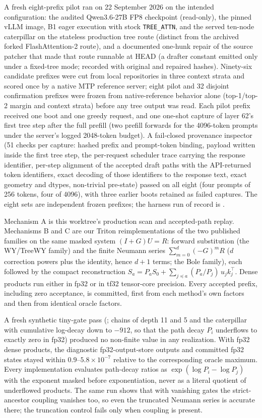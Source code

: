 \documentclass[conference]{IEEEtran}
\begin{document}
A fresh eight-prefix pilot ran on 22 September 2026 on the intended configuration: the audited Qwen3.6-27B FP8 checkpoint (read-only), the pinned vLLM image, B1 eager execution with stock \texttt{TREE\_ATTN}, and the served ten-node caterpillar on the stateless production tree route (distinct from the archived forked FlashAttention-2 route), and a documented one-hunk repair of the source patcher that made that route runnable at HEAD (a drafter constant emitted only under a fixed-tree mode; recorded with original and repaired hashes). Ninety-six candidate prefixes were cut from local repositories in three context strata and scored once by a native MTP reference server; eight pilot and 32 disjoint confirmation prefixes were frozen from native-reference behavior alone (top-1/top-2 margin and context strata) before any tree output was read. Each pilot prefix received one boot and one greedy request, and one one-shot capture of layer 62's first tree step after the full prefill (two prefill forwards for the 4096-token prompts under the server's logged 2048-token budget). A fail-closed provenance inspector (51 checks per capture: hashed prefix and prompt-token binding, payload written inside the first tree step, the per-request scheduler trace carrying the response identifier, per-step alignment of the accepted draft paths with the API-returned token identifiers, exact decoding of those identifiers to the response text, exact geometry and dtypes, non-trivial pre-state) passed on all eight (four prompts of 256 tokens, four of 4096), with three earlier boots retained as failed captures. The eight sets are independent frozen prefixes; the harness run of record is .

Mechanism A is this worktree's production scan and accepted-path replay. Mechanisms B and C are our Triton reimplementations of the two published families on the same masked system $(I+G)U=R$: forward substitution (the WY/TreeWY family) and the finite Neumann series $\sum_{m=0}^{d}(-G)^mR$ ($d$ correction powers plus the identity, hence $d+1$ terms; the Bole family), each followed by the compact reconstruction $S_a=P_aS_0+\sum_{j\preceq a}(P_a/P_j)\,u_jk_j^\top$. Dense products run either in fp32 or in tf32 tensor-core precision. Every accepted prefix, including zero acceptance, is committed, first from each method's own factors and then from identical oracle factors.

A fresh synthetic tiny-gate pass (; chains of depth 11 and 5 and the caterpillar with cumulative log-decay down to $-912$, so that the path decay $P_i$ underflows to exactly zero in fp32) produced no non-finite value in any realization. With fp32 dense products, the diagnostic fp32-output-store outputs and committed fp32 states stayed within $0.9$--$5.8\times10^{-7}$ relative to the corresponding oracle maximum. Every implementation evaluates path-decay ratios as $\exp(\log P_i-\log P_j)$ with the exponent masked before exponentiation, never as a literal quotient of underflowed products. The same run shows that with vanishing gates the strict-ancestor coupling vanishes too, so even the truncated Neumann series is accurate there; the truncation control fails only when coupling is present.
\end{document}
